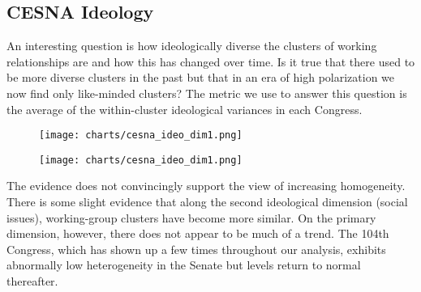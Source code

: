 \subsection{CESNA Ideology}

An interesting question is how ideologically diverse the clusters of working
relationships are and how this has changed over time. Is it true that there used
to be more diverse clusters in the past but that in an era of high polarization
we now find only like-minded clusters? The metric we use to answer this question
is the average of the within-cluster ideological variances in each Congress.

\begin{figure}[htbp]
  \centering
  \begin{minipage}[h]{0.4\textwidth}
    \texttt{[image: charts/cesna\_ideo\_dim1.png]}
  \end{minipage}
  \hfill
  \begin{minipage}[h]{0.4\textwidth}
    \texttt{[image: charts/cesna\_ideo\_dim1.png]}
  \end{minipage}
\end{figure}

The evidence does not convincingly support the view of increasing homogeneity.
There is some slight evidence that along the second ideological dimension
(social issues), working-group clusters have become more similar. On the primary
dimension, however, there does not appear to be much of a trend. The 104th
Congress, which has shown up a few times throughout our analysis, exhibits
abnormally low heterogeneity in the Senate but levels return to normal
thereafter.
